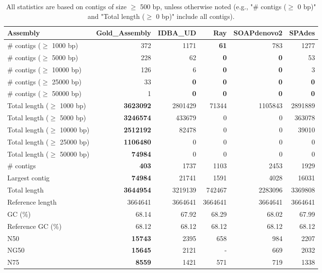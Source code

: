 \documentclass[12pt,a4paper]{article}
\begin{document}
\begin{table}[ht]
\begin{center}
\caption{All statistics are based on contigs of size $\geq$ 500 bp, unless otherwise noted (e.g., "\# contigs ($\geq$ 0 bp)" and "Total length ($\geq$ 0 bp)" include all contigs).}
\begin{tabular}{|l*{5}{|r}|}
\hline
Assembly & Gold\_Assembly & IDBA\_UD & Ray & SOAPdenovo2 & SPAdes \\ \hline
\# contigs ($\geq$ 1000 bp) & 372 & 1171 & {\bf 61} & 783 & 1277 \\ \hline
\# contigs ($\geq$ 5000 bp) & 228 & 62 & {\bf 0} & {\bf 0} & 53 \\ \hline
\# contigs ($\geq$ 10000 bp) & 126 & 6 & {\bf 0} & {\bf 0} & 3 \\ \hline
\# contigs ($\geq$ 25000 bp) & 33 & {\bf 0} & {\bf 0} & {\bf 0} & {\bf 0} \\ \hline
\# contigs ($\geq$ 50000 bp) & 1 & {\bf 0} & {\bf 0} & {\bf 0} & {\bf 0} \\ \hline
Total length ($\geq$ 1000 bp) & {\bf 3623092} & 2801429 & 71344 & 1105843 & 2891889 \\ \hline
Total length ($\geq$ 5000 bp) & {\bf 3246574} & 433679 & 0 & 0 & 363078 \\ \hline
Total length ($\geq$ 10000 bp) & {\bf 2512192} & 82478 & 0 & 0 & 39010 \\ \hline
Total length ($\geq$ 25000 bp) & {\bf 1106480} & 0 & 0 & 0 & 0 \\ \hline
Total length ($\geq$ 50000 bp) & {\bf 74984} & 0 & 0 & 0 & 0 \\ \hline
\# contigs & {\bf 403} & 1737 & 1103 & 2453 & 1929 \\ \hline
Largest contig & {\bf 74984} & 21741 & 1591 & 4028 & 16031 \\ \hline
Total length & {\bf 3644954} & 3219139 & 742467 & 2283096 & 3369808 \\ \hline
Reference length & 3664641 & 3664641 & 3664641 & 3664641 & 3664641 \\ \hline
GC (\%) & 68.14 & 67.92 & 68.29 & 68.02 & 67.99 \\ \hline
Reference GC (\%) & 68.12 & 68.12 & 68.12 & 68.12 & 68.12 \\ \hline
N50 & {\bf 15743} & 2395 & 658 & 984 & 2207 \\ \hline
NG50 & {\bf 15645} & 2121 & - & 669 & 2032 \\ \hline
N75 & {\bf 8559} & 1421 & 571 & 719 & 1338 \\ \hline

\end{tabular}
\end{center}
\end{table}
\end{document}
